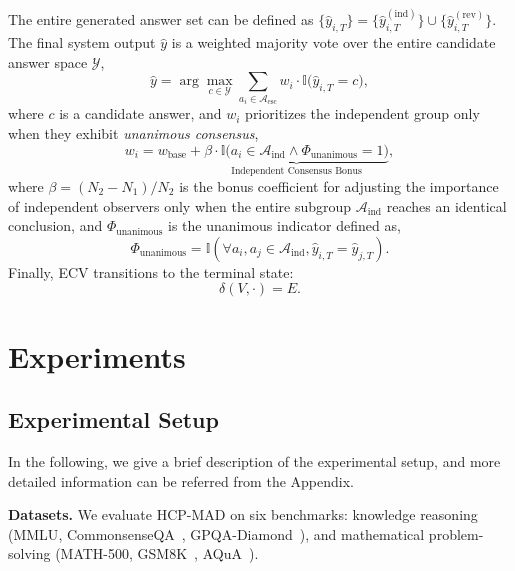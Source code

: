 \documentclass[11pt]{article}
\begin{document}
The entire generated answer set can be defined as
$\{
\hat{y}_{i,T}
\}
=
\{
\hat{y}_{i,T}^{(\mathrm{ind})}
\}
\cup
\{
\hat{y}_{i,T}^{(\mathrm{rev})}
\}$.
The final system output $\hat{y}$ is a weighted majority vote over the entire candidate answer space $\mathcal{Y}$, 
\begin{equation}
    \hat{y} = \arg\max_{c \in \mathcal{Y}} \sum_{a_i \in \mathcal{A}_{\text{esc}}} w_i \cdot \mathbb{I}\bigl( \hat{y}_{i,T} = c \bigr),
\end{equation}
where $c$ is a candidate answer, and $w_i$ prioritizes the independent group only when they exhibit \emph{unanimous consensus},
\begin{equation}
    w_i = w_{\text{base}} + \underbrace{\beta \cdot \mathbb{I}\bigl( a_i \in \mathcal{A}_{\text{ind}} \land \Phi_{\text{unanimous}} = 1 \bigr)}_{\text{Independent Consensus Bonus}} ,
\label{eq:17}
\end{equation}
where $\beta = (N_2 - N_1)/N_2$ is the bonus coefficient for adjusting the importance of independent observers only when the entire subgroup $\mathcal{A}_{\text{ind}}$ reaches an identical conclusion, and $\Phi_{\text{unanimous}}$ is the unanimous indicator defined as,
\begin{equation}
    \Phi_{\text{unanimous}} = \mathbb{I} \left( \forall a_i, a_j \in \mathcal{A}_{\text{ind}}, \hat{y}_{i,T} = \hat{y}_{j,T}\right).
\end{equation}
Finally, ECV transitions to the terminal state:
\begin{equation}
\delta(V,\cdot)={E}.
\end{equation}


\section{Experiments}
\subsection{Experimental Setup}
In the following, we give a brief description of the experimental setup, and more detailed information can be referred from the Appendix.

\noindent\textbf{Datasets.} We evaluate HCP-MAD on six benchmarks:
knowledge reasoning 
(MMLU\cite{hendrycksmeasuring}, CommonsenseQA~\cite{talmor2019commonsenseqa}, GPQA-Diamond~\cite{rein2024gpqa}), and mathematical problem-solving (MATH-500\cite{hendrycks2021measuring}, GSM8K~\cite{cobbe2021training}, AQuA~\cite{ling2017program}).
\end{document}
